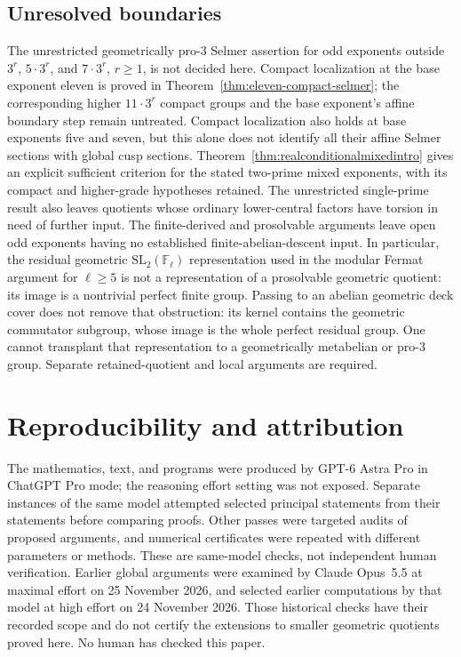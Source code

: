 \documentclass[11pt]{article}
\newcommand{\F}{\mathbb F}
\theoremstyle{definition}
\begin{document}
\subsection{Unresolved boundaries}
The unrestricted geometrically pro-$3$ Selmer assertion for odd
exponents outside $3^r$, $5\cdot3^r$, and $7\cdot3^r$, $r\ge1$, is not decided here.
Compact localization at the base exponent eleven is proved in
Theorem~\ref{thm:eleven-compact-selmer}; the corresponding higher
$11\cdot3^r$ compact groups and the base exponent's affine boundary
step remain untreated. Compact localization also holds at base
exponents five and seven, but this alone does not identify all their
affine Selmer sections with global cusp sections.
Theorem~\ref{thm:realconditionalmixedintro} gives an explicit sufficient
criterion for the stated two-prime mixed exponents, with its compact
and higher-grade hypotheses retained. The
unrestricted single-prime result also leaves quotients whose ordinary
lower-central factors have torsion in need of further input. The
finite-derived and prosolvable arguments leave open odd exponents
having no established finite-abelian-descent input. In particular, the residual geometric
$\mathrm{SL}_2(\F_\ell)$ representation used in the modular Fermat
argument for $\ell\geq5$ is not a representation of a prosolvable
geometric quotient: its image is a nontrivial perfect finite group.
Passing to an abelian geometric deck cover does not remove that
obstruction: its kernel contains the geometric commutator subgroup,
whose image is the whole perfect residual group. One cannot transplant
that representation to a geometrically metabelian or pro-$3$ group.
Separate retained-quotient and local
arguments are required.













\section*{Reproducibility and attribution}
The mathematics, text, and programs were produced by GPT-6 Astra Pro
in ChatGPT Pro mode; the reasoning effort setting was not exposed.
Separate instances of the same model attempted selected principal
statements from their statements before comparing proofs. Other
passes were targeted audits of proposed arguments, and numerical
certificates were repeated with different parameters or methods.
These are same-model checks, not independent human verification.
Earlier global arguments were examined by Claude Opus~5.5 at maximal
effort on 25 November 2026, and selected earlier computations by that
model at high effort on 24 November 2026. Those historical checks
have their recorded scope and do not certify the extensions to
smaller geometric quotients proved here. No human has checked this
paper.
\end{document}
